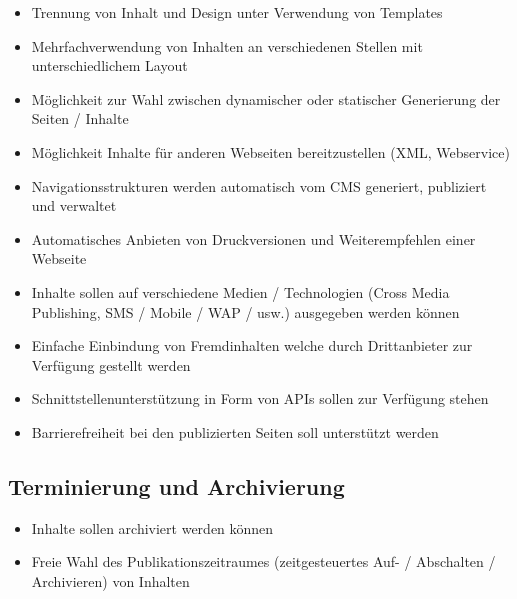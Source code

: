 \begin{itemize}
\item
Trennung von Inhalt und Design unter Verwendung von Templates
\item
Mehrfachverwendung von Inhalten an verschiedenen Stellen mit unterschiedlichem Layout
\item
Möglichkeit zur Wahl zwischen dynamischer oder statischer Generierung der Seiten / Inhalte
\item
Möglichkeit Inhalte für anderen Webseiten bereitzustellen (XML, Webservice)
\item
Navigationsstrukturen werden automatisch vom CMS generiert, publiziert und verwaltet
\item
Automatisches Anbieten von Druckversionen und Weiterempfehlen einer Webseite
\item
Inhalte sollen auf verschiedene Medien / Technologien (Cross Media Publishing, SMS / Mobile / WAP / usw.) ausgegeben werden können
\item
Einfache Einbindung von Fremdinhalten welche durch Drittanbieter zur Verfügung gestellt werden
\item
Schnittstellenunterstützung in Form von APIs sollen zur Verfügung stehen
\item
Barrierefreiheit bei den publizierten Seiten soll unterstützt werden
\end{itemize}


\subsection{Terminierung und Archivierung}
\label{sec:archi}
\begin{itemize}
\item
Inhalte sollen archiviert werden können
\item
Freie Wahl des Publikationszeitraumes (zeitgesteuertes Auf- / Abschalten / Archivieren) von Inhalten
\end{itemize}


